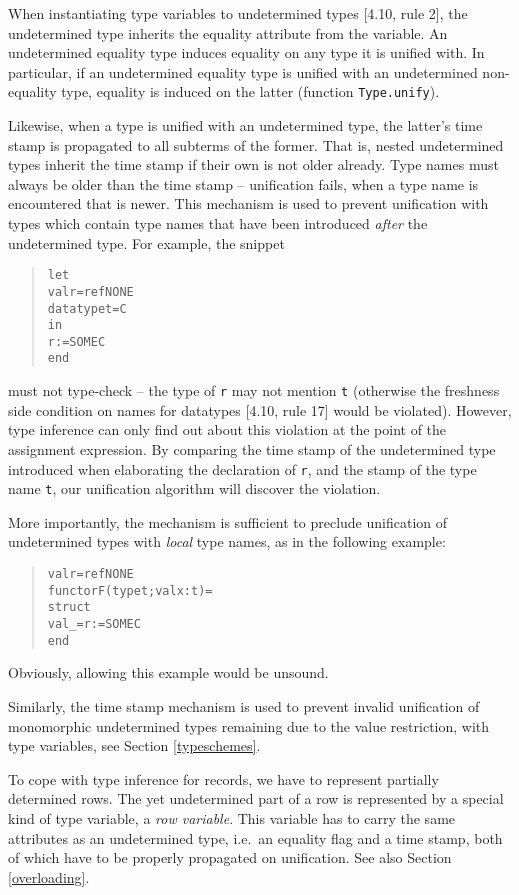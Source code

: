 \documentclass[twoside,titlepage]{article}
\begin{document}
When instantiating type variables to undetermined types [4.10, rule 2], the undetermined type inherits the equality attribute from the variable. An undetermined equality type induces equality on any type it is unified with. In particular, if an undetermined equality type is unified with an undetermined non-equality type, equality is induced on the latter (function {\tt Type.unify}).

Likewise, when a type is unified with an undetermined type, the latter's time stamp is propagated to all subterms of the former. That is, nested undetermined types inherit the time stamp if their own is not older already. Type names must always be older than the time stamp -- unification fails, when a type name is encountered that is newer. This mechanism is used to prevent unification with types which contain type names that have been introduced {\em after} the undetermined type. For example, the snippet
\begin{quote}
\begin{alltt}
let
    val r = ref NONE
    datatype t = C
in
    r := SOME C
end
\end{alltt}
\end{quote}
must not type-check -- the type of {\tt r} may not mention {\tt t} (otherwise the freshness side condition on names for datatypes [4.10, rule 17] would be violated). However, type inference can only find out about this violation at the point of the assignment expression. By comparing the time stamp of the undetermined type introduced when elaborating the declaration of {\tt r}, and the stamp of the type name {\tt t}, our unification algorithm will discover the violation.

More importantly, the mechanism is sufficient to preclude unification of undetermined types with {\em local} type names, as in the following example:
\begin{quote}
\begin{alltt}
val r = ref NONE
functor F(type t; val x : t) =
struct
    val _ = r := SOME C
end
\end{alltt}
\end{quote}
Obviously, allowing this example would be unsound.

Similarly, the time stamp mechanism is used to prevent invalid unification of monomorphic undetermined types remaining due to the value restriction, with type variables, see Section \ref{typeschemes}.

To cope with type inference for records, we have to represent partially determined rows. The yet undetermined part of a row is represented by a special kind of type variable, a {\em row variable}. This variable has to carry the same attributes as an undetermined type, i.e.\ an equality flag and a time stamp, both of which have to be properly propagated on unification. See also Section \ref{overloading}.
\end{document}
